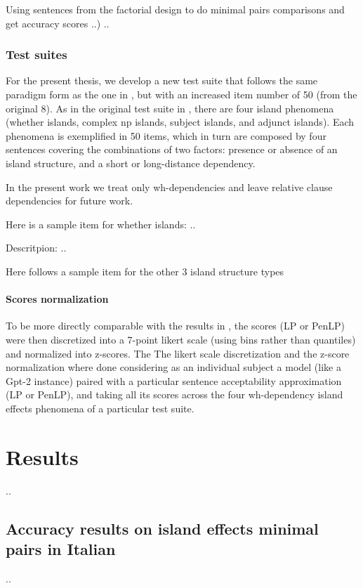 Using sentences from the factorial design to do minimal pairs comparisons and get accuracy scores ..)
..

\subsection{Test suites}

For the present thesis, we develop a new test suite that follows the same paradigm form as the one in \citet{sprouse2016experimental}, but with an increased item number of 50 (from the original 8). As in the original test suite in \citet{sprouse2016experimental}, there are four island phenomena (whether islands, complex np islands, subject islands, and adjunct islands). Each phenomena is exemplified in 50 items, which in turn are composed by four sentences covering the combinations of two factors: presence or absence of an island structure, and a short or long-distance dependency.

In the present work we treat only wh-dependencies and leave relative clause dependencies for future work.

Here is a sample item for whether islands:
..

Descritpion: ..

Here follows a sample item for the other 3 island structure types

\subsubsection{Scores normalization}

To be more directly comparable with the results in \citet{sprouse2016experimental}, the scores (LP or PenLP) were then discretized into a 7-point likert scale (using bins rather than quantiles) and normalized into z-scores.
The The likert scale discretization and the z-score normalization where done considering as an individual subject a model (like a Gpt-2 instance) paired with a particular sentence acceptability approximation (LP or PenLP), and taking all its scores across the four wh-dependency island effects phenomena of a particular test suite.

\chapter{Results}
..

\section{Accuracy results on island effects minimal pairs in Italian}
..

